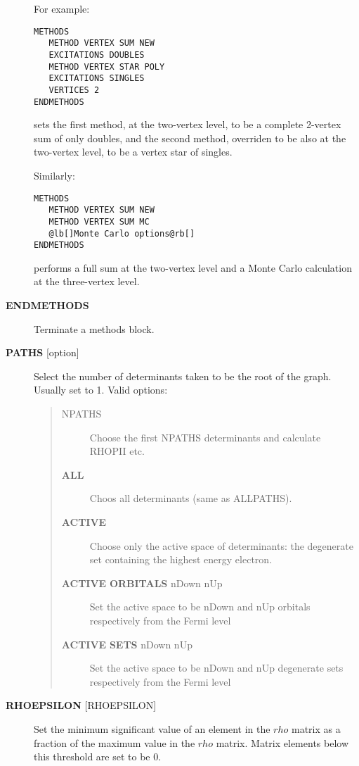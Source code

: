 \documentclass[openany,a4paper,10pt]{manual}
\begin{document}
\begin{description}
For example:

\begin{Verbatim}[commandchars=@\[\]]
METHODS
   METHOD VERTEX SUM NEW
   EXCITATIONS DOUBLES
   METHOD VERTEX STAR POLY
   EXCITATIONS SINGLES
   VERTICES 2
ENDMETHODS
\end{Verbatim}

sets the first method, at the two-vertex level, to be a complete 2-vertex
sum of only doubles, and the second method, overriden to be also at
the two-vertex level, to be a vertex star of singles.

Similarly:

\begin{Verbatim}[commandchars=@\[\]]
METHODS
   METHOD VERTEX SUM NEW
   METHOD VERTEX SUM MC
   @lb[]Monte Carlo options@rb[]
ENDMETHODS
\end{Verbatim}

performs a full sum at the two-vertex level and a Monte Carlo
calculation at the three-vertex level.

\item[\textbf{ENDMETHODS}]
Terminate a methods block.

\item[\textbf{PATHS} {[}option{]}]
Select the number of determinants taken to be the root of the graph.
Usually set to 1.  Valid options:
\begin{quote}
\begin{description}
\item[NPATHS]
Choose the first NPATHS determinants and calculate RHOPII etc.

\item[\textbf{ALL}]
Choos all determinants (same as ALLPATHS).

\item[\textbf{ACTIVE}]
Choose only the active space of determinants: the degenerate
set containing the highest energy electron.

\item[\textbf{ACTIVE} \textbf{ORBITALS} nDown nUp]
Set the active space to be nDown and nUp orbitals respectively
from the Fermi level

\item[\textbf{ACTIVE} \textbf{SETS} nDown nUp]
Set the active space to be nDown and nUp degenerate sets
respectively from the Fermi level

\end{description}
\end{quote}

\item[\textbf{RHOEPSILON} {[}RHOEPSILON{]}]
Set the minimum significant value of an element in the $rho$
matrix as a fraction of the maximum value in the $rho$ matrix.
Matrix elements below this threshold are set to be 0.


\end{description}
\end{document}
